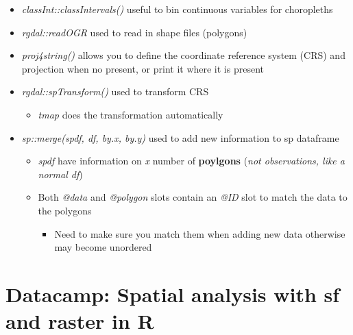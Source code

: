 \documentclass{article}
\begin{document}
\begin{itemize}
\begin{itemize}
    \end{itemize}
    \item \textit{classInt::classIntervals()} useful to bin continuous variables for choropleths
    \item \textit{rgdal::readOGR} used to read in shape files (polygons)
    \item \textit{proj4string()} allows you to define the coordinate reference system (CRS) and projection when no present, or print it where it is present
    \item \textit{rgdal::spTransform()} used to transform CRS
    \begin{itemize}
        \item \textit{tmap} does the transformation automatically
    \end{itemize}
    \item \textit{sp::merge(spdf, df, by.x, by.y)} used to add new information to sp dataframe

    \begin{itemize}
        \item \textit{spdf} have information on \textit{x} number of \textbf{poylgons} (\textit{not observations, like a normal df})
        \item Both \textit{@data} and \textit{@polygon} slots contain an \textit{@ID} slot to match the data to the polygons
        \begin{itemize}
            \item Need to make sure you match them when adding new data otherwise may become unordered
        \end{itemize}
    \end{itemize}
\end{itemize}

\section{Datacamp: Spatial analysis with sf and raster in R}
\end{document}
